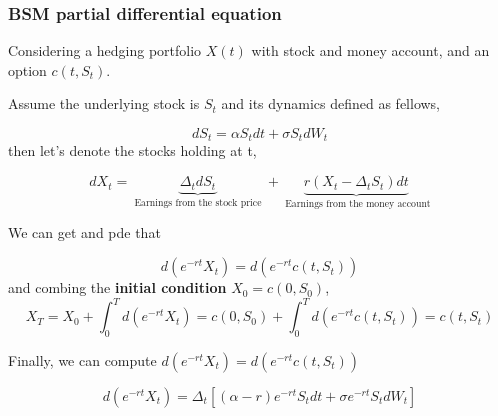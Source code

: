 \documentclass[a4]{article}
\begin{document}
\subsubsection{BSM partial differential equation}\par 
Considering a hedging portfolio $X(t)$ with stock and money account, and an option $c(t,S_{t})$.
\par 
Assume the underlying stock is $S_{t}$ and its dynamics defined as fellows,\par 
\begin{equation}
dS_{t} = \alpha S_{t} dt + \sigma S_{t}dW_{t}
\end{equation}
then let's denote the stocks holding at t,\par 
\begin{equation}
	dX_{t} =\underbrace{ \Delta_{t}dS_{t} }_{\text{ Earnings from the stock price }}+ \underbrace{ r(X_{t}-\Delta _{t}S_{t})dt }_{\text{ Earnings from the money account}}
\end{equation}\par 
We can get and pde that \par 
\begin{equation}
d(e^{-rt}X_{t}) = d(e^{-rt}c(t,S_{t}))
\end{equation}
and combing the \textbf{initial condition} $X_{0}=c(0,S_{0})$,
\begin{equation}
X_{T} =X_{0} + \int_{0}^{T}d(e^{-rt}X_{t})  = c(0,S_{0}) + \int_{0}^{T}d(e^{-rt}c(t,S_{t})) = c(t,S_{t})
\end{equation}\par 
Finally, we can compute $d(e^{-rt}X_{t})= d(e^{-rt}c(t,S_{t}))$\par 
$$
d(e^{-rt}X_{t}) = \Delta _{t}\left[(\alpha - r)e^{-rt}S_{t}dt+\sigma e^{-rt}S_{t}dW_{t}\right]
$$
\end{document}
